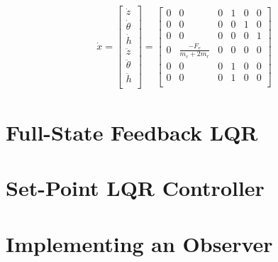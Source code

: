 \documentclass[dvips,12pt]{article}
\begin{document}
\begin{gather}
 \dot{x}
 =
 \begin{bmatrix}
     \dot{z} \\
     \dot{\theta} \\
     \dot{h} \\
     \ddot{z} \\
     \ddot{\theta} \\
     \ddot{h} \\
   \end{bmatrix}
   =   
   \begin{bmatrix}
        0 & 0 & 0 & 1 & 0 & 0  \\
        0 & 0 & 0 & 0 & 1 & 0 \\
        0 & 0 & 0 & 0 & 0 & 1 \\
        0 & \frac{-F_e}{m_c + 2m_r} & 0 & 0 & 0 & 0 \\
        0 & 0 & 0 & 1 & 0 & 0 \\
        0 & 0 & 0 & 1 & 0 & 0 \\
      \end{bmatrix}
\end{gather}

\section{Full-State Feedback LQR}

\section{Set-Point LQR Controller}

\section{Implementing an Observer}
\end{document}
